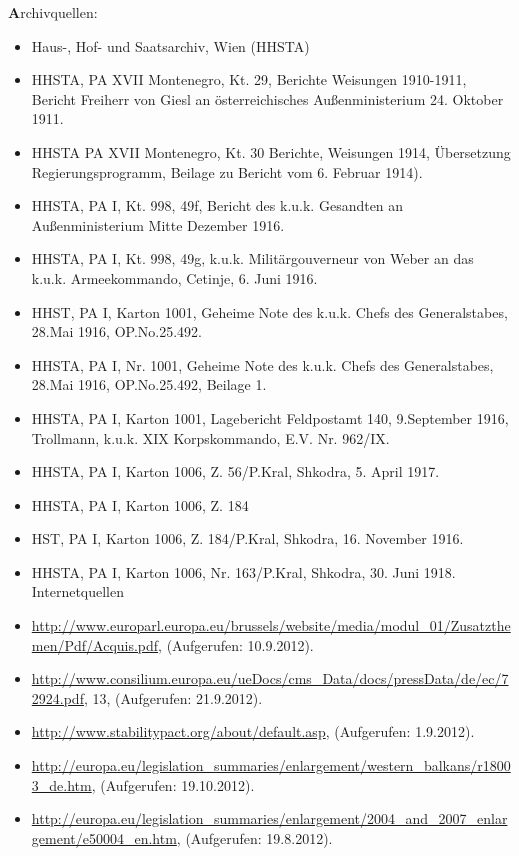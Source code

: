 {\textbf Archivquellen:}\vspace{0,5cm}
\begin{itemize}[label={},itemsep=0pt]
\item Haus-, Hof- und Saatsarchiv, Wien (HHSTA)
\item HHSTA, PA XVII Montenegro, Kt. 29, Berichte Weisungen 1910-1911, Bericht Freiherr von Giesl an österreichisches Außenministerium 24. Oktober 1911.
\item HHSTA PA XVII Montenegro, Kt. 30 Berichte, Weisungen 1914, Übersetzung Regierungsprogramm, Beilage zu Bericht vom 6. Februar 1914).
\item HHSTA, PA I, Kt. 998, 49f, Bericht des k.u.k. Gesandten an Außenministerium Mitte Dezember 1916.
\item HHSTA, PA I, Kt. 998, 49g, k.u.k. Militärgouverneur von Weber an das k.u.k. Armeekommando, Cetinje, 6. Juni 1916.
\item HHST, PA I, Karton 1001, Geheime Note des k.u.k. Chefs des Generalstabes, 28.Mai 1916, OP.No.25.492.
\item HHSTA, PA I, Nr. 1001, Geheime Note des k.u.k. Chefs des Generalstabes, 28.Mai 1916, OP.No.25.492, Beilage 1.
\item HHSTA, PA I, Karton 1001, Lagebericht Feldpostamt 140, 9.September 1916, Trollmann, k.u.k. XIX Korpskommando, E.V. Nr. 962/IX.
\item HHSTA, PA I, Karton 1006, Z. 56/P.Kral, Shkodra, 5. April 1917. 
\item HHSTA, PA I, Karton 1006, Z. 184
\item HST, PA I, Karton 1006, Z. 184/P.Kral, Shkodra, 16. November 1916.
\item HHSTA, PA I, Karton 1006, Nr. 163/P.Kral, Shkodra, 30. Juni 1918.
Internetquellen
\item\url{http://www.europarl.europa.eu/brussels/website/media/modul_01/Zusatzthemen/Pdf/Acquis.pdf}, (Aufgerufen: 10.9.2012).
\item\url{http://www.consilium.europa.eu/ueDocs/cms_Data/docs/pressData/de/ec/72924.pdf}, 13, (Aufgerufen: 21.9.2012).
\item\url{http://www.stabilitypact.org/about/default.asp}, (Aufgerufen: 1.9.2012).
\item\url{http://europa.eu/legislation_summaries/enlargement/western_balkans/r18003_de.htm}, (Aufgerufen: 19.10.2012).
\item\url{http://europa.eu/legislation_summaries/enlargement/2004_and_2007_enlargement/e50004_en.htm}, (Aufgerufen: 19.8.2012).

\end{itemize}
